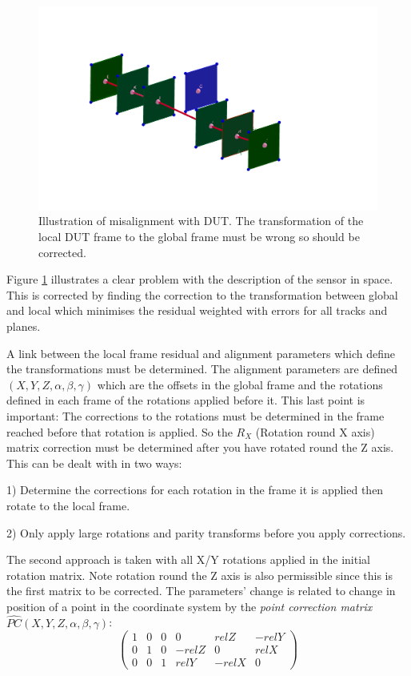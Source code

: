 \begin{figure}[H]
\centering
\includegraphics[width=1.0\linewidth]{figures/MisAlignStraight.png}
\caption{Illustration of misalignment with DUT. The transformation of the local DUT frame to the global frame must be wrong so should be corrected.}
\label{fig:MisAlign}
\end{figure}

Figure \ref{fig:MisAlign} illustrates a clear problem with the description of the sensor in space. This is corrected by finding the correction to the transformation between global and local which minimises the residual weighted with errors for all tracks and planes.

A link between the local frame residual and alignment parameters which define the transformations must be determined. The alignment parameters are defined $(X,Y,Z, \alpha,\beta,\gamma)$ which are the offsets in the global frame and the rotations defined in each frame of the rotations applied before it. This last point is important: The corrections to the rotations must be determined in the frame reached before that rotation is applied. So the $R_X$ (Rotation round X axis) matrix correction must be determined after you have rotated round the Z axis. This can be dealt with in two ways: 

1) Determine the corrections for each rotation in the frame it is applied then rotate to the local frame. 

2) Only apply large rotations and parity transforms before you apply corrections. 

The second approach is taken with all X/Y rotations applied in the initial rotation matrix. Note rotation round the Z axis is also permissible since this is the first matrix to be corrected. The parameters' change is related to change in position of a point in the coordinate system by the  \emph{point correction matrix} $\hat{PC}(X,Y,Z, \alpha,\beta,\gamma)$:
\[ \left( \begin{array}{cccccc}
1 & 0 & 0 & 0 & relZ & -relY \\
0 & 1 & 0 & -relZ & 0 & relX  \\
0 & 0 & 1 & relY & -relX & 0   
  \label{eq:PC}
\end{array}
 \right)\] 

